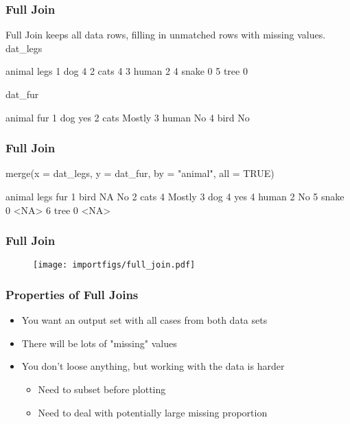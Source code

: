 \documentclass[10pt,american]{beamer}
\renewenvironment{Schunk}{}{}
\renewenvironment{Sinput}{}{}
\begin{document}
\begin{frame}
\frametitle{Full Join}

Full Join keeps all data rows, filling in unmatched rows with missing
values.
\begin{Schunk}
\begin{Sinput}
 dat_legs
\end{Sinput}
\begin{Soutput}
  animal legs
1    dog    4
2   cats    4
3  human    2
4  snake    0
5   tree    0
\end{Soutput}
\begin{Sinput}
 dat_fur
\end{Sinput}
\begin{Soutput}
  animal    fur
1    dog    yes
2   cats Mostly
3  human     No
4   bird     No
\end{Soutput}
\end{Schunk}
\end{frame}


\begin{frame}
\frametitle{Full Join}
\begin{Schunk}
\begin{Sinput}
 merge(x = dat_legs, y = dat_fur, by = "animal", all = TRUE)
\end{Sinput}
\begin{Soutput}
  animal legs    fur
1   bird   NA     No
2   cats    4 Mostly
3    dog    4    yes
4  human    2     No
5  snake    0   <NA>
6   tree    0   <NA>
\end{Soutput}
\end{Schunk}
\end{frame}


\begin{frame}[containsverbatim]
\frametitle{Full Join}
\begin{figure}
\texttt{[image: importfigs/full\_join.pdf]}
\end{figure}
\end{frame}


\begin{frame}
\frametitle{Properties of Full Joins}
\begin{itemize}
\item You want an output set with all cases from both data sets
\item There will be lots of "missing" values
\item You don't loose anything, but working with the data is harder
\begin{itemize}
\item Need to subset before plotting 
\item Need to deal with potentially large missing proportion
\end{itemize}
\end{itemize}
\end{frame}
\end{document}
